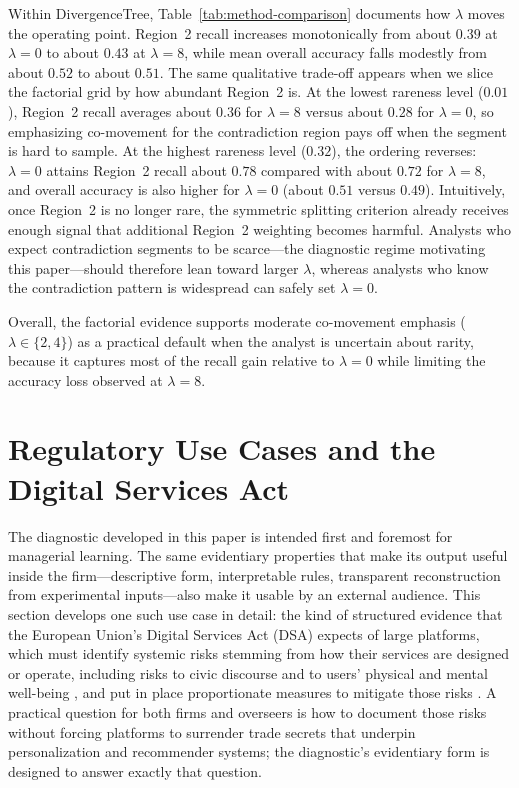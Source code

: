 \documentclass[11pt,letterpaper,english]{article}
\theoremstyle{definition}
\theoremstyle{definition}
\begin{document}
\begin{bibunit}
Within DivergenceTree, Table~\ref{tab:method-comparison} documents how $\lambda$ moves the operating point. Region~2 recall increases monotonically from about $0.39$ at $\lambda=0$ to about $0.43$ at $\lambda=8$, while mean overall accuracy falls modestly from about $0.52$ to about $0.51$. The same qualitative trade-off appears when we slice the factorial grid by how abundant Region~2 is. At the lowest rareness level ($0.01$), Region~2 recall averages about $0.36$ for $\lambda=8$ versus about $0.28$ for $\lambda=0$, so emphasizing co-movement for the contradiction region pays off when the segment is hard to sample. At the highest rareness level ($0.32$), the ordering reverses: $\lambda=0$ attains Region~2 recall about $0.78$ compared with about $0.72$ for $\lambda=8$, and overall accuracy is also higher for $\lambda=0$ (about $0.51$ versus $0.49$). Intuitively, once Region~2 is no longer rare, the symmetric splitting criterion already receives enough signal that additional Region~2 weighting becomes harmful. Analysts who expect contradiction segments to be scarce---the diagnostic regime motivating this paper---should therefore lean toward larger $\lambda$, whereas analysts who know the contradiction pattern is widespread can safely set $\lambda=0$.

Overall, the factorial evidence supports moderate co-movement emphasis ($\lambda \in \{2,4\}$) as a practical default when the analyst is uncertain about rarity, because it captures most of the recall gain relative to $\lambda=0$ while limiting the accuracy loss observed at $\lambda=8$.


\section{Regulatory Use Cases and the Digital Services Act}
\label{sec:applications}

The diagnostic developed in this paper is intended first and foremost for managerial learning. The same evidentiary properties that make its output useful inside the firm---descriptive form, interpretable rules, transparent reconstruction from experimental inputs---also make it usable by an external audience. This section develops one such use case in detail: the kind of structured evidence that the European Union's Digital Services Act (DSA) expects of large platforms, which must identify systemic risks stemming from how their services are designed or operate, including risks to civic discourse and to users' physical and mental well-being \citep{dsa2022article34}, and put in place proportionate measures to mitigate those risks \citep{dsa2022article35}. A practical question for both firms and overseers is how to document those risks without forcing platforms to surrender trade secrets that underpin personalization and recommender systems; the diagnostic's evidentiary form is designed to answer exactly that question.


\end{bibunit}
\end{document}
